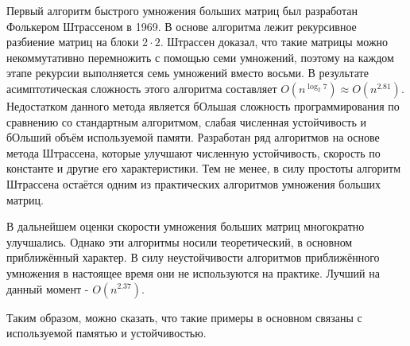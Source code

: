 \documentclass[a4paper, 12pt]{article}
\begin{document}
	Первый алгоритм быстрого умножения больших матриц был разработан Фолькером Штрассеном в 1969. В основе алгоритма лежит рекурсивное разбиение матриц на блоки $2 \cdot 2$. Штрассен доказал, что такие матрицы можно некоммутативно перемножить с помощью семи умножений, поэтому на каждом этапе рекурсии выполняется семь умножений вместо восьми. В результате асимптотическая сложность этого алгоритма составляет $O(n^{\log _{2}7})\approx O(n^{2.81})$. Недостатком данного метода является бОльшая сложность программирования по сравнению со стандартным алгоритмом, слабая численная устойчивость и бОльший объём используемой памяти. Разработан ряд алгоритмов на основе метода Штрассена, которые улучшают численную устойчивость, скорость по константе и другие его характеристики. Тем не менее, в силу простоты алгоритм Штрассена остаётся одним из практических алгоритмов умножения больших матриц.
	
	В дальнейшем оценки скорости умножения больших матриц многократно улучшались. Однако эти алгоритмы носили теоретический, в основном приближённый характер. В силу неустойчивости алгоритмов приближённого умножения в настоящее время они не используются на практике. Лучший на данный момент - $O(n^{2.37})$.
	
	Таким образом, можно сказать, что такие примеры в основном связаны с используемой памятью и устойчивостью.
\end{document}

